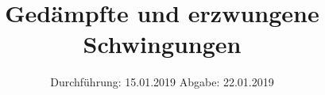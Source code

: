 

\subject{V354}
\title{Gedämpfte und erzwungene Schwingungen}
\date{%
Durchführung: {15.01.2019}
\hspace{3em}
Abgabe: {22.01.2019}
}



\maketitle
\thispagestyle{empty}
\tableofcontents
\newpage





\printbibliography{}

